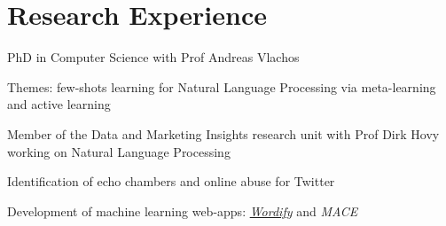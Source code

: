 \documentclass[]{deedy-resume-reversed}
\begin{document}
%
%

%
%

%
%

\begin{minipage}[t]{0.60\textwidth}



\section{Research Experience}

\vspace{\topsep}
\begin{tightemize}
\item PhD in Computer Science with Prof Andreas Vlachos
\item Themes: few-shots learning for Natural Language Processing via meta-learning and active learning
\end{tightemize}
\sectionsep

\begin{tightemize}
\item Member of the Data and Marketing Insights research unit with Prof Dirk Hovy working on Natural Language Processing
\item Identification of echo chambers and online abuse for Twitter
\item Development of machine learning web-apps: \href{https://wordify.unibocconi.it/}{\it Wordify} and \textit{MACE}
\end{tightemize}
\sectionsep



\end{minipage}
\end{document}
